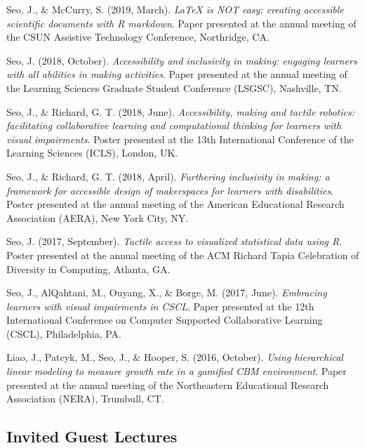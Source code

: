 \documentclass[11pt,a4paper,]{moderncv}
\begin{document}
Seo, J., \& McCurry, S. (2019, March). \emph{LaTeX is NOT easy: creating accessible scientific documents with R markdown}. Paper presented at the annual meeting of the CSUN Assistive Technology Conference, Northridge, CA.

Seo, J. (2018, October). \emph{Accessibility and inclusivity in making: engaging learners with all abilities in making activities}. Paper presented at the annual meeting of the Learning Sciences Graduate Student Conference (LSGSC), Nashville, TN.

Seo, J., \& Richard, G. T. (2018, June). \emph{Accessibility, making and tactile robotics: facilitating collaborative learning and computational thinking for learners with visual impairments}. Poster presented at the 13th International Conference of the Learning Sciences (ICLS), London, UK.

Seo, J., \& Richard, G. T. (2018, April). \emph{Furthering inclusivity in making: a framework for accessible design of makerspaces for learners with disabilities}. Poster presented at the annual meeting of the American Educational Research Association (AERA), New York City, NY.

Seo, J. (2017, September). \emph{Tactile access to visualized statistical data using R}. Poster presented at the annual meeting of the ACM Richard Tapia Celebration of Diversity in Computing, Atlanta, GA.

Seo, J., AlQahtani, M., Ouyang, X., \& Borge, M. (2017, June). \emph{Embracing learners with visual impairments in CSCL}. Paper presented at the 12th International Conference on Computer Supported Collaborative Learning (CSCL), Philadelphia, PA.

Liao, J., Patcyk, M., Seo, J., \& Hooper, S. (2016, October). \emph{Using hierarchical linear modeling to measure growth rate in a gamified CBM environment}. Paper presented at the annual meeting of the Northeastern Educational Research Association (NERA), Trumbull, CT.

\endgroup

\hypertarget{invited-guest-lectures}{%
\subsection{Invited Guest Lectures}\label{invited-guest-lectures}}
\end{document}
